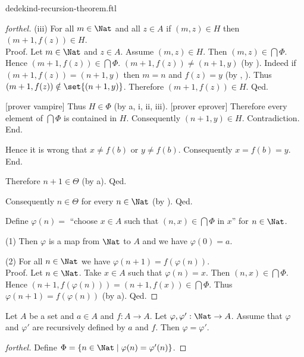 \documentclass{naproche-library}
\begin{document}
\begin{smodule}{dedekind-recursion-theorem.ftl}
\begin{proof}[forthel]
            (iii) For all $m \in \Nat$ and all $z \in A$ if $(m,z) \in H$ then $(m + 1,f(z)) \in H$. \\
            Proof.
              Let $m \in \Nat$ and $z \in A$.
              Assume $(m,z) \in H$.
              Then $(m,z) \in \bigcap \Phi$.
              Hence $(m + 1,f(z)) \in \bigcap \Phi$.
              $(m + 1,f(z)) \neq (n + 1,y)$ (by ).
              Indeed if $(m + 1,f(z)) = (n + 1,y)$ then $m = n$ and $f(z) = y$ (by , ).
              Thus $(m + 1,f(z)) \notin \set{(n + 1,y)}$.
              Therefore $(m + 1,f(z)) \in H$.
            Qed.

            [prover vampire]
            Thus $H \in \Phi$ (by a, i, ii, iii).
            [prover eprover]
            Therefore every element of $\bigcap \Phi$ is contained in $H$.
            Consequently $(n + 1,y) \in H$.
            Contradiction.
          End.

          Hence it is wrong that $x \neq f(b)$ or $y \neq f(b)$.
          Consequently $x = f(b) = y$.
        End.

        Therefore $n + 1 \in \Theta$ (by a).
      Qed.

      Consequently $n \in \Theta$ for every $n \in \Nat$ (by ).
    Qed.

    Define $\varphi(n) =$ ``choose $x \in A$ such that $(n, x) \in
    \bigcap \Phi$ in $x$'' for $n \in \Nat$.

    (1) Then $\varphi$ is a map from $\Nat$ to $A$ and we have
    $\varphi(0) = a$.

    (2) For all $n \in \Nat$ we have $\varphi(n + 1) =
    f(\varphi(n))$. \\
    Proof.
      Let $n \in \Nat$.
      Take $x \in A$ such that $\varphi(n) = x$.
      Then $(n, x) \in \bigcap \Phi$.
      Hence $(n + 1, f(\varphi(n))) = (n + 1, f(x)) \in \bigcap \Phi$.
      Thus $\varphi(n + 1) = f(\varphi(n))$ (by a).
    Qed.
  \end{proof}
  
  \begin{theorem*}[forthel,title=Dedekind's Recursion Theorem: Uniqueness,id=dedekind_uniqueness]
    Let $A$ be a set and $a \in A$ and $f : A \to A$.
    Let $\varphi, \varphi' : \Nat \to A$.
    Assume that $\varphi$ and $\varphi'$ are recursively defined by $a$ and
    $f$.
    Then $\varphi = \varphi'$.
  \end{theorem*}
  \begin{proof}[forthel]
    Define $\Phi = \{ n \in \Nat \mid \varphi(n) = \varphi'(n) \}$.


\end{proof}
\end{smodule}
\end{document}
